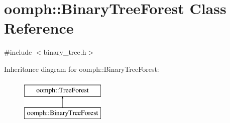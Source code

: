 \hypertarget{classoomph_1_1BinaryTreeForest}{}\section{oomph\+:\+:Binary\+Tree\+Forest Class Reference}
\label{classoomph_1_1BinaryTreeForest}


{\ttfamily \#include $<$binary\+\_\+tree.\+h$>$}

Inheritance diagram for oomph\+:\+:Binary\+Tree\+Forest\+:\begin{figure}[H]
\begin{center}
\leavevmode
\includegraphics[height=2.000000cm]{classoomph_1_1BinaryTreeForest}
\end{center}
\end{figure}
